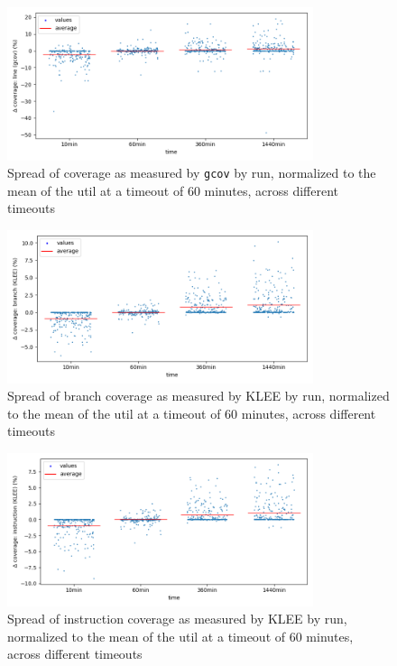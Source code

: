 \documentclass{article}
\begin{document}
\begin{figure}[htbp]
    \centering
    \includegraphics[width=0.8\textwidth]{../plots/gcov_cov/changes-by-time.png}
    \captionsetup{width=0.6\textwidth}
    \caption{Spread of coverage as measured by \lstinline{gcov} by run, normalized to the mean of the util at a timeout of 60 minutes, across different timeouts}
\end{figure}
\begin{figure}[htbp]
    \centering
    \includegraphics[width=0.8\textwidth]{../plots/klee_BCov/changes-by-time.png}
    \captionsetup{width=0.6\textwidth}
    \caption{Spread of branch coverage as measured by KLEE by run, normalized to the mean of the util at a timeout of 60 minutes, across different timeouts}
\end{figure}
\begin{figure}[htbp]
    \centering
    \includegraphics[width=0.8\textwidth]{../plots/klee_ICov/changes-by-time.png}
    \captionsetup{width=0.6\textwidth}
    \caption{Spread of instruction coverage as measured by KLEE by run, normalized to the mean of the util at a timeout of 60 minutes, across different timeouts}
\end{figure}
\end{document}

